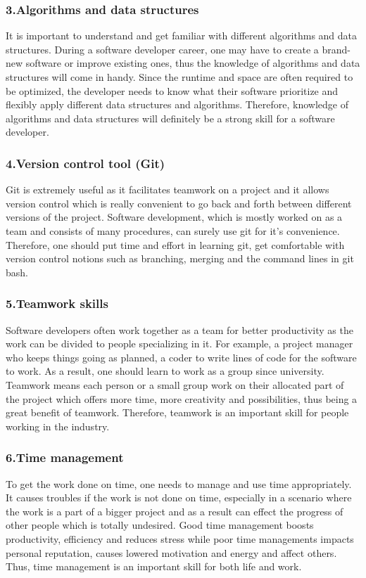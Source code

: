 \documentclass[a4paper, 11pt]{report}
\begin{document}
	\subsubsection{3.Algorithms and data structures}
	It is important to understand and get familiar with different algorithms and data structures. During a software developer career, one may have to create a brand-new software or improve existing ones, thus the knowledge of algorithms and data structures will come in handy. Since the runtime and space are often required to be optimized, the developer needs to know what their software prioritize and flexibly apply different data structures and algorithms. Therefore, knowledge of algorithms and data structures will definitely be a strong skill for a software developer.
	\subsubsection{4.Version control tool (Git)} 
	Git is extremely useful as it facilitates teamwork on a project and it allows version control which is really convenient to go back and forth between different versions of the project. Software development, which is mostly worked on as a team and consists of many procedures, can surely use git for it’s convenience. Therefore, one should put time and effort in learning git, get comfortable with version control notions such as branching, merging and the command lines in git bash.
	\subsubsection{5.Teamwork skills}
	 Software developers often work together as a team for better productivity as the work can be divided to people specializing in it. For example, a project manager who keeps things going as planned, a coder to write lines of code for the software to work.
As a result, one should learn to work as a group since university. Teamwork means each person or a small group work on their allocated part of the project which offers more time, more creativity and possibilities, thus being a great benefit of teamwork. Therefore, teamwork is an important skill for people working in the industry.
	\subsubsection{6.Time management}
	 To get the work done on time, one needs to manage and use time appropriately. It causes troubles if the work is not done on time, especially in a scenario where the work is a part of a bigger project and as a result can effect the progress of other people which is totally undesired. Good time management boosts productivity, efficiency and reduces stress while poor time managements impacts personal reputation, causes lowered motivation and energy and affect others. Thus, time management is an important skill for both life and work.
\end{document}
